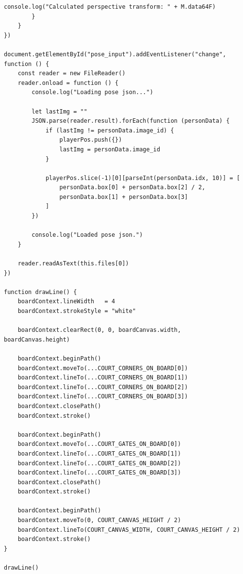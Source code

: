 \documentclass[a4j, fleqn, 12pt]{jsreport}
\begin{document}
\begin{lstlisting}[caption=index.js, label=src:js]
            console.log("Calculated perspective transform: " + M.data64F)
        }
    }
})

document.getElementById("pose_input").addEventListener("change", function () {
    const reader = new FileReader()
    reader.onload = function () {
        console.log("Loading pose json...")

        let lastImg = ""
        JSON.parse(reader.result).forEach(function (personData) {
            if (lastImg != personData.image_id) {
                playerPos.push({})
                lastImg = personData.image_id
            }

            playerPos.slice(-1)[0][parseInt(personData.idx, 10)] = [
                personData.box[0] + personData.box[2] / 2,
                personData.box[1] + personData.box[3]
            ]
        })
        
        console.log("Loaded pose json.")
    }

    reader.readAsText(this.files[0])
})

function drawLine() {
    boardContext.lineWidth   = 4
    boardContext.strokeStyle = "white"

    boardContext.clearRect(0, 0, boardCanvas.width, boardCanvas.height)
    
    boardContext.beginPath()
    boardContext.moveTo(...COURT_CORNERS_ON_BOARD[0])
    boardContext.lineTo(...COURT_CORNERS_ON_BOARD[1])
    boardContext.lineTo(...COURT_CORNERS_ON_BOARD[2])
    boardContext.lineTo(...COURT_CORNERS_ON_BOARD[3])
    boardContext.closePath()
    boardContext.stroke()

    boardContext.beginPath()
    boardContext.moveTo(...COURT_GATES_ON_BOARD[0])
    boardContext.lineTo(...COURT_GATES_ON_BOARD[1])
    boardContext.lineTo(...COURT_GATES_ON_BOARD[2])
    boardContext.lineTo(...COURT_GATES_ON_BOARD[3])
    boardContext.closePath()
    boardContext.stroke()

    boardContext.beginPath()
    boardContext.moveTo(0, COURT_CANVAS_HEIGHT / 2)
    boardContext.lineTo(COURT_CANVAS_WIDTH, COURT_CANVAS_HEIGHT / 2)
    boardContext.stroke()
}

drawLine()\end{lstlisting}
\end{document}
